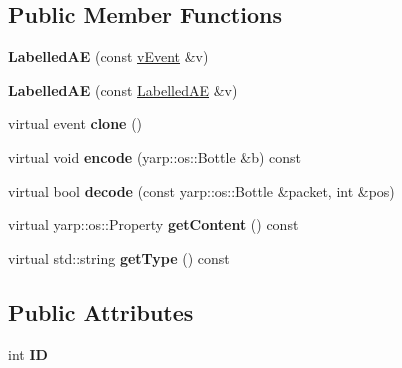 \subsection*{Public Member Functions}
\begin{DoxyCompactItemize}
\item 
{\bfseries Labelled\+AE} (const \hyperlink{classev_1_1vEvent}{v\+Event} \&v)\hypertarget{classev_1_1LabelledAE_ad9d765e87dbd81bddf3b58b7ba0f1b8a}{}\label{classev_1_1LabelledAE_ad9d765e87dbd81bddf3b58b7ba0f1b8a}

\item 
{\bfseries Labelled\+AE} (const \hyperlink{classev_1_1LabelledAE}{Labelled\+AE} \&v)\hypertarget{classev_1_1LabelledAE_aeca0ead752908e7c7f22aeb69b4f7e3a}{}\label{classev_1_1LabelledAE_aeca0ead752908e7c7f22aeb69b4f7e3a}

\item 
virtual event {\bfseries clone} ()\hypertarget{classev_1_1LabelledAE_aad6de4f38547d2b586c333de1c247ccf}{}\label{classev_1_1LabelledAE_aad6de4f38547d2b586c333de1c247ccf}

\item 
virtual void {\bfseries encode} (yarp\+::os\+::\+Bottle \&b) const \hypertarget{classev_1_1LabelledAE_a8e6ad790b6c44ca7482a073f594c1bf7}{}\label{classev_1_1LabelledAE_a8e6ad790b6c44ca7482a073f594c1bf7}

\item 
virtual bool {\bfseries decode} (const yarp\+::os\+::\+Bottle \&packet, int \&pos)\hypertarget{classev_1_1LabelledAE_a77cdc54c31f7998368a17277d2d6662a}{}\label{classev_1_1LabelledAE_a77cdc54c31f7998368a17277d2d6662a}

\item 
virtual yarp\+::os\+::\+Property {\bfseries get\+Content} () const \hypertarget{classev_1_1LabelledAE_acaf1c5db1cd5c1e639a151abd36ff57e}{}\label{classev_1_1LabelledAE_acaf1c5db1cd5c1e639a151abd36ff57e}

\item 
virtual std\+::string {\bfseries get\+Type} () const \hypertarget{classev_1_1LabelledAE_a331be65fc4ecb022ede92b02bff91ec6}{}\label{classev_1_1LabelledAE_a331be65fc4ecb022ede92b02bff91ec6}

\end{DoxyCompactItemize}
\subsection*{Public Attributes}
\begin{DoxyCompactItemize}
\item 
int {\bfseries ID}\hypertarget{classev_1_1LabelledAE_a59a295976cdf867006deea22d7cf1942}{}\label{classev_1_1LabelledAE_a59a295976cdf867006deea22d7cf1942}

\end{DoxyCompactItemize}
